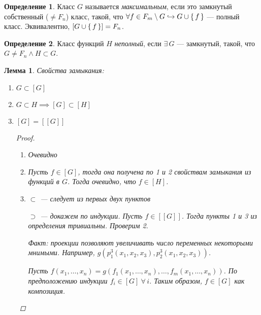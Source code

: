 \documentclass[12pt]{article}
\let\un\cup
\let\wot\setminus
\theoremstyle{definition}
\newtheorem{definition}{Определение}[section]
\theoremstyle{plain}
\newtheorem{lemma}{Лемма}[section]
\theoremstyle{remark}
\begin{document}
\begin{definition}
  Класс $G$ называется \textit{максимальным}, если это замкнутый
  собственный ($\neq F_n$) класс, такой, что $\forall f \in F_m \wot
  G \hookrightarrow G \un \set{f}$ --- полный класс. Эквивалентно,
  $[G \un \set{f}] = F_n$.
\end{definition}
\begin{definition}
  Класс функций $H$ \textit{неполный}, если $\exists\, G$ ---
  замкнутый, такой, что $G \neq F_n \land H \subset G$.
\end{definition}
\begin{lemma}
  Свойства замыкания:
  \begin{enumerate}
    \item $G \subset [G]$

    \item $G \subset H \implies [G] \subset [H]$

    \item $[G] = [[G]]$
      \begin{proof}
        \begin{enumerate}
          \item Очевидно

          \item Пусть $f \in [G]$, тогда она получена по 1 и 2
            свойствам замыкания из функций в $G$. Тогда очевидно, что
            $f \in [H]$.

          \item
            $\subset$ --- следует из первых двух пунктов

            $\supset$ --- докажем по индукции. Пусть $f \in [[G]]$. Тогда
            пункты 1 и 3 из определения тривиальны. Проверим 2.

            Факт: проекции позволяют увеличивать число переменных
            некоторыми мнимыми. Например, $g(p_1^3(x_1, x_2, x_3),
            p_2^3(x_1, x_2, x_3))$.

            Пусть $f(x_1, \ldots, x_n) = g(f_1(x_1, \ldots, x_n), \ldots,
            f_m(x_1, \ldots, x_n))$. По предположению индукции $f_i \in
            [G]\ \forall\, i$. Таким образом, $f \in [G]$ как композиция.
        \end{enumerate}
      \end{proof}
  \end{enumerate}
\end{lemma}
\end{document}
